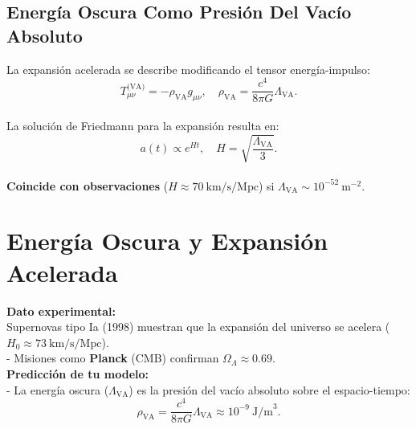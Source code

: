 \documentclass[a4paper]{article}
\theoremstyle{definition}
\theoremstyle{remark}
\numberwithin{equation}{section}
\begin{document}
	\subsection{Energía Oscura Como Presión Del Vacío Absoluto}
	
	La expansión acelerada se describe modificando el tensor energía-impulso:\\
	
	\begin{equation}
		T_{\mu\nu}^{\text{(VA)}} = - \rho_{\text{VA}} g_{\mu\nu}, \quad \rho_{\text{VA}} = \frac{c^4}{8\pi G} \Lambda_{\text{VA}}.
	\end{equation}\\
	
	La solución de Friedmann para la expansión resulta en:\\
	
	\begin{equation}
		a(t) \propto e^{Ht}, \quad H = \sqrt{\frac{\Lambda_{\text{VA}}}{3}}.
	\end{equation}\\
	
	\textbf{Coincide con observaciones} (\( H \approx 70 \ \text{km/s/Mpc} \)) si \( \Lambda_{\text{VA}} \sim 10^{-52} \ \text{m}^{-2} \).
	
	\section{Energía Oscura y Expansión Acelerada}
	
	\textbf{Dato experimental:}\\
	
	Supernovas tipo Ia (1998) muestran que la expansión del universo se acelera (\( H_0 \approx 73 \ \text{km/s/Mpc} \)).\\
	
	- Misiones como \textbf{Planck} (CMB) confirman \( \Omega_\Lambda \approx 0.69 \).\\
	
	\textbf{Predicción de tu modelo:}\\
	
	- La energía oscura (\( \Lambda_{\text{VA}} \)) es la presión del vacío absoluto sobre el espacio-tiempo:\\
	
	\begin{equation}
		\rho_{\text{VA}} = \frac{c^4}{8\pi G} \Lambda_{\text{VA}} \approx 10^{-9} \ \text{J/m}^3.
	\end{equation}\\
	
\end{document}
